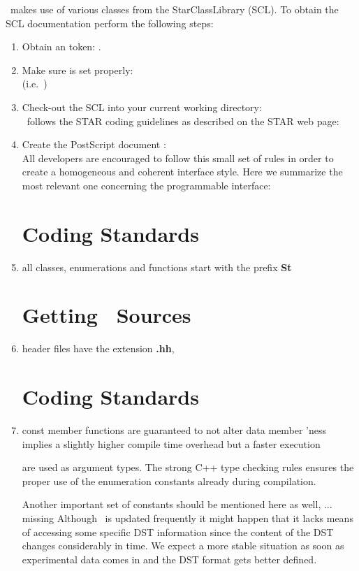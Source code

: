 \StEvent\ makes use of various classes from the StarClassLibrary (SCL).
To obtain the SCL documentation perform the following steps:
\begin{enumerate}
  \item Obtain an  token: .
  \item Make sure  is set properly:\\
    (i.e.~)
  \item Check-out the SCL into your current working directory:\\
\StEvent\ follows the STAR coding guidelines as described on the STAR web page: \\ 
  \item Create the PostScript document :\\
All developers are encouraged to follow this small set of rules 
in order to create a homogeneous and coherent interface style.
Here we summarize the most relevant one concerning the programmable interface:
\section{Coding Standards}  
\item all classes, enumerations and functions start with the prefix \textbf{St}
\section{Getting \StEvent\ Sources}  
\item header files have the extension \textbf{.hh},
\section{Coding Standards}
    \item const member functions are guaranteed to not alter data member
    'ness implies a slightly higher compile time overhead but a faster execution

are used as argument types. The strong C++ type checking rules ensures
the proper use of the enumeration constants already during
compilation.

Another important set of constants should be mentioned here as well,
... missing
Although \StEvent\ is updated frequently it might happen that it
lacks means of accessing some specific DST information
since the content of the DST changes considerably in time. We expect
a more stable situation as soon as experimental data comes in and
the DST format gets better defined.
\label{sec:conventionsNumbering}


\end{enumerate}
